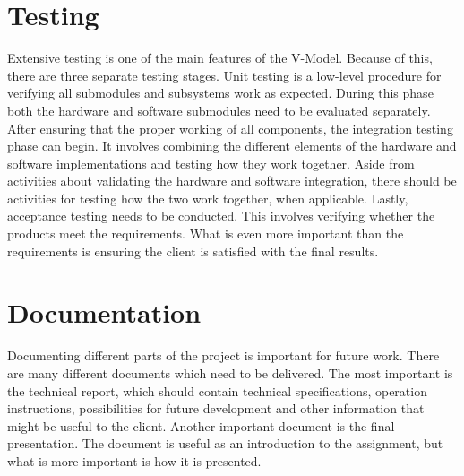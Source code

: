 \documentclass{report}
\begin{document}
	\section{Testing}
	Extensive testing is one of the main features of the V-Model. Because of this, there are three separate testing stages. Unit testing is a low-level procedure for verifying all submodules and subsystems work as expected. During this phase both the hardware and software submodules need to be evaluated separately. After ensuring that the proper working of all components, the integration testing phase can begin. It involves combining the different elements of the hardware and software implementations and testing how they work together. Aside from activities about validating the hardware and software integration, there should be activities for testing how the two work together, when applicable. Lastly, acceptance testing needs to be conducted. This involves verifying whether the products meet the requirements. What is even more important than the requirements is ensuring the client is satisfied with the final results.
	
	\section{Documentation}
	Documenting different parts of the project is important for future work. There are many different documents which need to be delivered. The most important is the technical report, which should contain technical specifications, operation instructions, possibilities for future development and other information that might be useful to the client. Another important document is the final presentation. The document is useful as an introduction to the assignment, but what is more important is how it is presented. 
	
	
	
\end{document}
